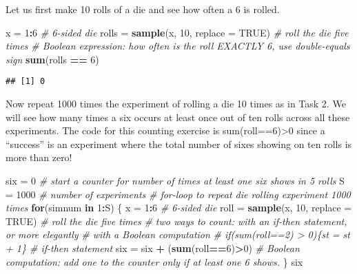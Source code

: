 \documentclass[
]{article}
\newenvironment{Shaded}{\begin{snugshade}}{\end{snugshade}}
\newcommand{\CommentTok}[1]{\textcolor[rgb]{0.56,0.35,0.01}{\textit{#1}}}
\newcommand{\ControlFlowTok}[1]{\textcolor[rgb]{0.13,0.29,0.53}{\textbf{#1}}}
\newcommand{\DataTypeTok}[1]{\textcolor[rgb]{0.13,0.29,0.53}{#1}}
\newcommand{\DecValTok}[1]{\textcolor[rgb]{0.00,0.00,0.81}{#1}}
\newcommand{\KeywordTok}[1]{\textcolor[rgb]{0.13,0.29,0.53}{\textbf{#1}}}
\newcommand{\NormalTok}[1]{#1}
\newcommand{\OperatorTok}[1]{\textcolor[rgb]{0.81,0.36,0.00}{\textbf{#1}}}
\newcommand{\OtherTok}[1]{\textcolor[rgb]{0.56,0.35,0.01}{#1}}
\newcommand{\StringTok}[1]{\textcolor[rgb]{0.31,0.60,0.02}{#1}}
\begin{document}
Let us first make 10 rolls of a die and see how often a 6 is rolled.

\begin{Shaded}
\begin{Highlighting}[]
\NormalTok{x =}\StringTok{ }\DecValTok{1}\OperatorTok{:}\DecValTok{6}  \CommentTok{# 6-sided die}
\NormalTok{rolls =}\StringTok{ }\KeywordTok{sample}\NormalTok{(x, }\DecValTok{10}\NormalTok{, }\DataTypeTok{replace =} \OtherTok{TRUE}\NormalTok{)  }\CommentTok{# roll the die five times}
\CommentTok{# Boolean expression: how often is the roll EXACTLY 6, use double-equals sign}
\KeywordTok{sum}\NormalTok{(rolls }\OperatorTok{==}\StringTok{ }\DecValTok{6}\NormalTok{)}
\end{Highlighting}
\end{Shaded}

\begin{verbatim}
## [1] 0
\end{verbatim}

Now repeat 1000 times the experiment of rolling a die 10 times as in
Task 2. We will see how many times a six occurs at least once out of ten
rolls across all these experiments. The code for this counting exercise
is sum(roll==6)\textgreater0 since a ``success'' is an experiment where
the total number of sixes showing on ten rolls is more than zero!

\begin{Shaded}
\begin{Highlighting}[]
\NormalTok{six =}\StringTok{ }\DecValTok{0} \CommentTok{# start a counter for number of times at least one six shows in 5 rolls}
\NormalTok{S =}\StringTok{ }\DecValTok{1000} \CommentTok{# number of experiments}
\CommentTok{# for-loop to repeat die rolling experiment 1000 times}
\ControlFlowTok{for}\NormalTok{(simnum }\ControlFlowTok{in} \DecValTok{1}\OperatorTok{:}\NormalTok{S)}
\NormalTok{\{}
\NormalTok{  x =}\StringTok{ }\DecValTok{1}\OperatorTok{:}\DecValTok{6} \CommentTok{# 6-sided die}
\NormalTok{  roll =}\StringTok{ }\KeywordTok{sample}\NormalTok{(x, }\DecValTok{10}\NormalTok{, }\DataTypeTok{replace =} \OtherTok{TRUE}\NormalTok{) }\CommentTok{# roll the die five times}
  \CommentTok{# two ways to count: with an if-then statement, or more elegantly }
  \CommentTok{# with a Boolean computation}
  \CommentTok{# if(sum(roll==2) > 0)\{st = st + 1\}  # if-then statement}
\NormalTok{  six =}\StringTok{ }\NormalTok{six }\OperatorTok{+}\StringTok{ }\NormalTok{(}\KeywordTok{sum}\NormalTok{(roll}\OperatorTok{==}\DecValTok{6}\NormalTok{)}\OperatorTok{>}\DecValTok{0}\NormalTok{) }
  \CommentTok{# Boolean computation: add one to the counter only if at least one 6 shows.}
\NormalTok{\}}
\NormalTok{six}
\end{Highlighting}
\end{Shaded}
\end{document}
